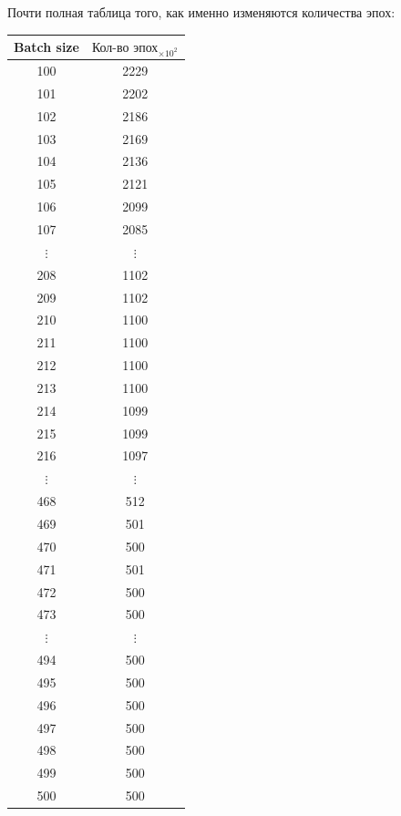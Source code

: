 \documentclass[12pt, a4paper, oneside, final]{article}
\begin{document}
	Почти полная таблица того, как именно изменяются количества эпох:
	\begin{table}[H]
		\centering
		\begin{tabular}{|c|c|}
			Batch size & $\text{Кол-во эпох}_{\times 10^2}$ \\ \hline
			100 & 2229 \\
			101 & 2202 \\
			102 & 2186 \\
			103 & 2169 \\
			104 & 2136 \\
			105 & 2121 \\
			106 & 2099 \\
			107 & 2085 \\
			$\vdots$ & $\vdots$ \\
			208 & 1102 \\
			209 & 1102 \\
			210 & 1100 \\
			211 & 1100 \\
			212 & 1100 \\
			213 & 1100 \\
			214 & 1099 \\
			215 & 1099 \\
			216 & 1097 \\
			$\vdots$ & $\vdots$ \\
			468 & 512 \\
			469 & 501 \\
			470 & 500 \\
			471 & 501 \\
			472 & 500 \\
			473 & 500 \\
			$\vdots$ & $\vdots$ \\
			494 & 500 \\
			495 & 500 \\
			496 & 500 \\
			497 & 500 \\
			498 & 500 \\
			499 & 500 \\
			500 & 500
		\end{tabular}
	\end{table}
\end{document}

